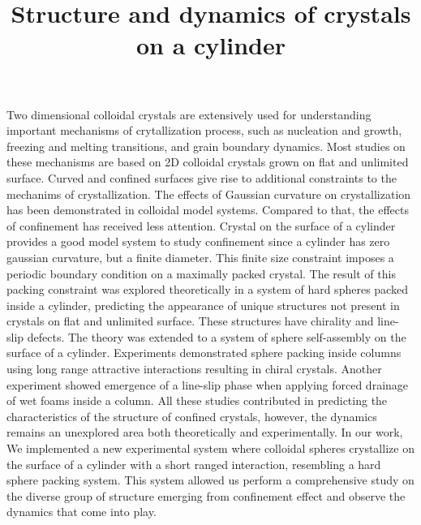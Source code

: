 \documentclass[12pt]{article}
\title{Structure and dynamics of crystals on a cylinder}
\date{}
\author{}
\begin{document}
\maketitle

 
Two dimensional colloidal crystals are extensively used for understanding important mechanisms of crytallization process, such as nucleation and growth\cite{savage_experimental_2009}, freezing and melting transitions\cite{thorneywork_two-dimensional_2017}\cite{savage_imaging_2006}, and grain boundary dynamics\cite{gokhale_grain_2013}\cite{skinner_supercooled_2011}. Most studies on these mechanisms are based on 2D colloidal crystals grown on flat and unlimited surface. Curved and confined surfaces give rise to additional constraints to the mechanims of crystallization. The effects of Gaussian curvature on crystallization has been demonstrated in colloidal model systems\cite{meng_elastic_2014}\cite{bausch_grain_2003}. Compared to that, the effects of confinement has received less attention. Crystal on the surface of a cylinder provides a good model system to study confinement since a cylinder has zero gaussian curvature, but a finite diameter. This finite size constraint imposes a periodic boundary condition on a maximally packed crystal. The result of this packing constraint was explored theoretically in a system of hard spheres packed inside a cylinder, predicting the appearance of unique structures not present in crystals on flat and unlimited surface\cite{mughal_phyllotactic_2011}\cite{mughal_dense_2012}. These structures have chirality and line-slip defects. The theory was extended to a system of sphere self-assembly on the surface of a cylinder\cite{wood_self-assembly_2013}. Experiments demonstrated sphere packing inside columns using long range attractive interactions resulting in chiral crystals\cite{wu_confined_2017}. Another experiment showed emergence of a line-slip phase when applying forced drainage of wet foams inside a column\cite{winkelmann_simulation_2017}. All these studies contributed in predicting the characteristics of the structure of confined crystals, however, the dynamics remains an unexplored area both theoretically and experimentally. In our work, We implemented a new experimental system where colloidal spheres crystallize on the surface of a cylinder with a short ranged interaction, resembling a hard sphere packing system. This system allowed us perform a comprehensive study on the diverse group of structure emerging from confinement effect and observe the dynamics that come into play.
\end{document}
